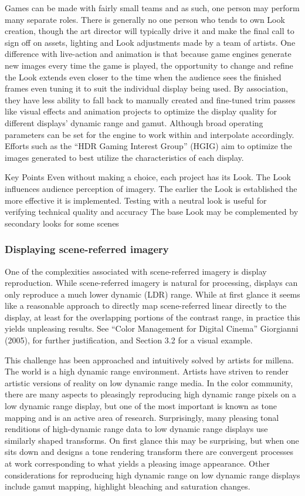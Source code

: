 Games can be made with fairly small teams and as such, one person may perform many separate roles. There is generally no one person who tends to own Look creation, though the art director will typically drive it and make the final call to sign off on assets, lighting and Look adjustments made by a team of artists. One difference with live-action and animation is that because game engines generate new images every time the game is played, the opportunity to change and refine the Look extends even closer to the time when the audience sees the finished frames even tuning it to suit the individual display being used. By association, they have less ability to fall back to manually created and fine-tuned trim passes like visual effects and animation projects to optimize the display quality for different displays’ dynamic range and gamut. Although broad operating parameters can be set for the engine to work within and interpolate accordingly. Efforts such as the “HDR Gaming Interest Group” (HGIG) aim to optimize the images generated to best utilize the characteristics of each display.

Key Points
Even without making a choice, each project has its Look.
The Look influences audience perception of imagery.
The earlier the Look is established the more effective it is implemented.
Testing with a neutral look is useful for verifying technical quality and accuracy
The base Look may be complemented by secondary looks for some scenes


\subsubsection{Displaying scene-referred imagery}

One of the complexities associated with scene-referred imagery is display reproduction. While scene-referred imagery is natural for processing, displays can only reproduce a much lower dynamic (LDR) range. While at first glance it seems like a reasonable approach to directly map scene-referred linear directly to the display, at least for the overlapping portions of the contrast range, in practice this yields unpleasing results. See “Color Management for Digital Cinema” Giorgianni (2005), for further justification, and Section 3.2 for a visual example.

This challenge has been approached and intuitively solved by artists for millena. The world is a high dynamic range environment. Artists have striven to render artistic versions of reality on low dynamic  range media.  In the color community, there are many aspects to pleasingly reproducing high dynamic range pixels on a low dynamic range display, but one of the most important is known as tone mapping and is an active area of research. Surprisingly, many pleasing tonal renditions of high-dynamic range data to low dynamic range displays use similarly shaped transforms. On first glance this may be surprising, but when one sits down and designs a tone rendering transform there are convergent processes at work corresponding to what yields a pleasing image appearance. Other considerations for reproducing high dynamic range on low dynamic range displays include gamut mapping, highlight bleaching and saturation changes.

